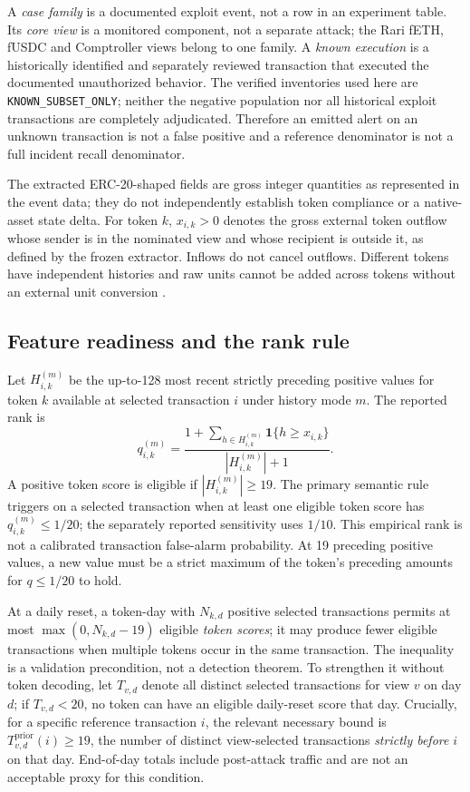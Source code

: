 \documentclass[preprint,12pt,authoryear]{elsarticle}
\begin{document}
A \emph{case family} is a documented exploit event, not a row in an experiment table. Its \emph{core view} is a monitored component, not a separate attack; the Rari fETH, fUSDC and Comptroller views belong to one family. A \emph{known execution} is a historically identified and separately reviewed transaction that executed the documented unauthorized behavior. The verified inventories used here are \texttt{KNOWN\_SUBSET\_ONLY}; neither the negative population nor all historical exploit transactions are completely adjudicated. Therefore an emitted alert on an unknown transaction is not a false positive and a reference denominator is not a full incident recall denominator.

The extracted ERC-20-shaped fields are gross integer quantities as represented in the event data; they do not independently establish token compliance or a native-asset state delta. For token $k$, $x_{i,k}>0$ denotes the gross external token outflow whose sender is in the nominated view and whose recipient is outside it, as defined by the frozen extractor. Inflows do not cancel outflows. Different tokens have independent histories and raw units cannot be added across tokens without an external unit conversion \citep{Vogelsteller2015ERC20}.

\subsection{Feature readiness and the rank rule}
Let $H_{i,k}^{(m)}$ be the up-to-128 most recent strictly preceding positive values for token $k$ available at selected transaction $i$ under history mode $m$. The reported rank is
\begin{equation}\label{eq:rank}
q_{i,k}^{(m)}=\frac{1+\sum_{h\in H_{i,k}^{(m)}}\mathbf{1}\{h\geq x_{i,k}\}}{|H_{i,k}^{(m)}|+1}.
\end{equation}
A positive token score is eligible if $|H_{i,k}^{(m)}|\geq 19$. The primary semantic rule triggers on a selected transaction when at least one eligible token score has $q_{i,k}^{(m)}\leq1/20$; the separately reported sensitivity uses $1/10$. This empirical rank is not a calibrated transaction false-alarm probability. At 19 preceding positive values, a new value must be a strict maximum of the token's preceding amounts for $q\leq1/20$ to hold.

At a daily reset, a token-day with $N_{k,d}$ positive selected transactions permits at most $\max(0,N_{k,d}-19)$ eligible \emph{token scores}; it may produce fewer eligible transactions when multiple tokens occur in the same transaction. The inequality is a validation precondition, not a detection theorem. To strengthen it without token decoding, let $T_{v,d}$ denote all distinct selected transactions for view $v$ on day $d$; if $T_{v,d}<20$, no token can have an eligible daily-reset score that day. Crucially, for a specific reference transaction $i$, the relevant necessary bound is $T_{v,d}^{\mathrm{prior}}(i)\geq19$, the number of distinct view-selected transactions \emph{strictly before} $i$ on that day. End-of-day totals include post-attack traffic and are not an acceptable proxy for this condition.
\end{document}
